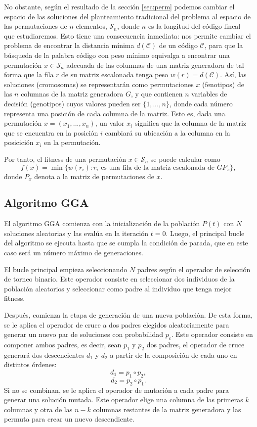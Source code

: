 No obstante, según el resultado de la sección \ref{sec:perm} podemos cambiar el espacio de las soluciones del planteamiento tradicional del problema al espacio de las permutaciones de $n$ elementos, $\mathcal{S}_n$, donde $n$ es la longitud del código lineal que estudiaremos. Esto tiene una consecuencia inmediata: nos permite cambiar el problema de encontrar la distancia mínima $d(\mathcal{C})$ de un código $\mathcal{C}$, para que la búsqueda de la palabra código con peso mínimo equivalga a encontrar una permutación $x \in \mathcal{S}_n$ adecuada de las columnas de una matriz generadora de tal forma que la fila $r$ de su matriz escalonada tenga peso $w(r) = d(\mathcal{C})$. Así, las soluciones (cromosomas) se representarán como permutaciones $x$ (fenotipos) de las $n$ columnas de la matriz generadora $G$, y que contienen $n$ variables de decisión (genotipos) cuyos valores pueden ser $\{ 1,...,n\}$, donde cada número representa una posición de cada columna de la matriz. Esto es, dada una permutación $x = (x_1, ..., x_n)$, un valor $x_i$ significa que la columna de la matriz que se encuentra en la posición $i$ cambiará su ubicación a la columna en la posicición $x_i$ en la permutación.

Por tanto, el fitness de una permutación $x \in \mathcal{S}_n$ se puede calcular como
\[
    f(x) = \min \{w(r_i) : r_i \text{ es una fila de la matriz escalonada de } GP_x \},
\]
donde $P_x$ denota a la matriz de permutaciones de $x$.

\subsection{Algoritmo GGA}

El algoritmo GGA comienza con la inicialización de la población $P(t)$ con $N$ soluciones aleatorias y las evalúa en la iteración $t = 0$. Luego, el principal bucle del algoritmo se ejecuta hasta que se cumpla la condición de parada, que en este caso será un número máximo de generaciones. 

El bucle principal empieza seleccionando $N$ padres según el operador de selección de torneo binario. Este operador consiste en seleccionar dos individuos de la población aleatorios y seleccionar como padre al individuo que tenga mejor fitness.

Después, comienza la etapa de generación de una nueva población. De esta forma, se le aplica el operador de cruce a dos padres elegidos aleatoriamente para generar un nuevo par de soluciones con probabilidad $p_c$. Este operador consiste en componer ambos padres, es decir, sean $p_1$ y $p_2$ dos padres, el operador de cruce generará dos descencientes $d_1$ y $d_2$ a partir de la composición de cada uno en distintos órdenes:
\[
    d_1 = p_1 \circ p_2,
\]
\[
    d_2 = p_2 \circ p_1.
\]
Si no se combinan, se le aplica el operador de mutación a cada padre para generar una solución mutada. Este operador elige una columna de las primeras $k$ columnas y otra de las $n-k$ columnas restantes de la matriz generadora y las permuta para crear un nuevo descendiente.

